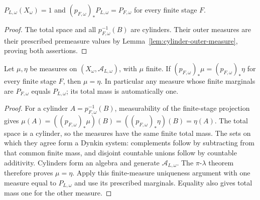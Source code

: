 \begin{proposition}\label{prop:algebraic-fibre-marginals}
\leanok
{}
$P_{L,\omega}(X_\omega)=1$ and
$(p_{F,\omega})_*P_{L,\omega}=P_{F,\omega}$ for every finite stage $F$.
\end{proposition}
\begin{proof}
The total space and all $p_{F,\omega}^{-1}(B)$ are cylinders. Their
outer measures are their prescribed premeasure values by
Lemma~\ref{lem:cylinder-outer-measure}, proving both assertions.
\end{proof}

\begin{lemma}\label{lem:algebraic-fibre-uniqueness}
\leanok
{}
Let $\mu,\eta$ be measures on $(X_\omega,\mathcal A_{L,\omega})$,
with $\mu$ finite. If $(p_{F,\omega})_*\mu=(p_{F,\omega})_*\eta$
for every finite stage $F$, then $\mu=\eta$.
In particular any measure whose finite marginals are $P_{F,\omega}$
equals $P_{L,\omega}$; its total mass is automatically one.
\end{lemma}
\begin{proof}
For a cylinder $A=p_{F,\omega}^{-1}(B)$, measurability of the finite-stage
projection gives
$\mu(A)=((p_{F,\omega})_*\mu)(B)=((p_{F,\omega})_*\eta)(B)=\eta(A)$.
The total space is a cylinder, so the measures have the same finite
total mass. The sets on which they agree form a Dynkin system:
complements follow by subtracting from that common finite mass, and
disjoint countable unions follow by countable additivity. Cylinders
form an algebra and generate $\mathcal A_{L,\omega}$. The
$\pi$-$\lambda$ theorem therefore proves $\mu=\eta$.
Apply this finite-measure uniqueness argument with one measure equal
to $P_{L,\omega}$ and use its prescribed marginals. Equality also gives
total mass one for the other measure.
\end{proof}

